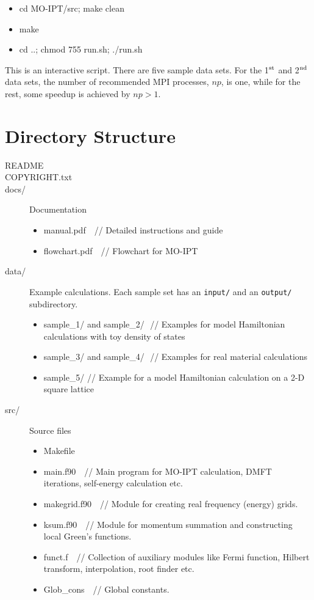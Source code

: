 \documentclass[a4paper]{article}
\begin{document}
\begin{itemize}
\item{cd MO-IPT/src; make clean}
\item{make}
\item{cd ..; chmod 755 run.sh; ./run.sh} 
\end{itemize}

This is an interactive script.  There are five sample data sets. For the 1$^{\rm st}$
and 2$^{\rm nd}$ data sets, the number of recommended MPI processes, $np$, is one, while for
the rest, some speedup is achieved by $np > 1$. 

\section{Directory Structure}
\begin{description}
\item [README]
\item [COPYRIGHT.txt]  
\item [docs/] Documentation
\begin{itemize}
\item manual.pdf  $ $  $ $  // Detailed instructions and guide
\item flowchart.pdf $ $ $ $ // Flowchart for MO-IPT
\end{itemize}
\item [data/] Example calculations. Each sample set has an {\tt input/} and an 
{\tt output/}
subdirectory.
\begin{itemize}
\item sample\_1/ and sample\_2/ $  $ // Examples for model Hamiltonian calculations with toy density of states
\item sample\_3/ and sample\_4/ $ $ // Examples for real material calculations
\item sample\_5/ // Example for a model Hamiltonian calculation on a 
2-D square lattice
\end{itemize} 
\item [src/] Source files
\begin{itemize}
\item Makefile
\item main.f90  $ $ $ $ // Main program for MO-IPT calculation, DMFT iterations, self-energy calculation etc.
\item makegrid.f90 $ $ $  $ // Module for creating real frequency (energy) grids.
\item ksum.f90     $ $ $ $ // Module for momentum summation and constructing local Green's functions.
\item funct.f $ $ $ $ // Collection of auxiliary modules like Fermi function, Hilbert
transform, interpolation, root finder etc. 
\item Glob\_cons   $ $ $ $ // Global constants.
\end{itemize}
\end{description}
\end{document}
